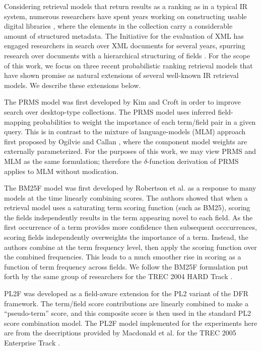\documentclass{sig-alternate}
\begin{document}
Considering retrieval models that return results as a ranking as in a typical IR system, numerous researchers have spent years working on constructing usable digital libraries \cite{entlich-tois-1997, fox-dls-2003, yi-sigir-2007}, where the elements in the collection carry a considerable amount of structured metadata. The Initiative for the evaluation of XML has engaged researchers in search over XML documents for several years, spurring research over documents with a hierarchical structuring of fields \cite{fuhr-inex-2002}. For the scope of this work, we focus on three recent probabilistic ranking retrieval models that have shown promise as natural extensions of several well-known IR retrieval models. We describe these extensions below.
 
The PRMS model was first developed by Kim and Croft \cite{kim-sigir-2009, kim-sigir-2010} in order to improve search over desktop-type collections. The PRMS model uses inferred field-mapping probabilities to weight the importance of each term/field pair in a given query. This is in contrast to the mixture of language-models (MLM) approach first proposed by Ogilvie and Callan \cite{ogilvie-sigir-2003}, where the component model weights are externally parameterized. For the purposes of this work, we may view PRMS and MLM as the same formulation; therefore the $\delta$-function derivation of PRMS applies to MLM without modication.

The BM25F model was first developed by Robertson et al. \cite{Robertson-cikm-2004} as a response to many models at the time linearly combining scores. The authors showed that when a retrieval model uses a saturating term scoring function (such as BM25), scoring the fields independently results in the term appearing novel to each field. As the first occurrence of a term provides more confidence then subsequent occcurrences, scoring fields independently overweights the importance of a term. Instead, the authors combine at the term frequency level, then apply the scoring function over the combined frequencies. This leads to a much smoother rise in scoring as a function of term frequency across fields. We follow the BM25F formulation put forth by the same group of researchers for the TREC 2004 HARD Track \cite{Zaragoza-trec-2004}.

PL2F was developed as a field-aware extension for the PL2 variant of the DFR framework. The term/field score contributions are linearly combined to make a ``pseudo-term'' score, and this composite score is then used in the standard PL2 score combination model. The PL2F model implemented for the experiments here are from the dsecriptions provided by Macdonald et al. for the TREC 2005 Enterprise Track  \cite{macdonald-trec-2005}.
\end{document}
